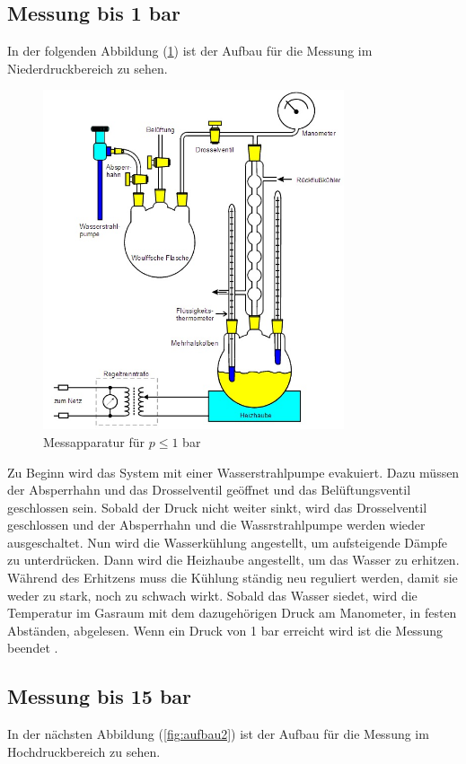 \subsection{Messung bis 1 bar}
In der folgenden Abbildung (\ref{fig:aufbau1}) ist der Aufbau für die Messung im Niederdruckbereich
zu sehen.

\begin{figure}
  \centering
  \includegraphics[height=10cm]{Aufbau1.jpg}
  \caption{Messapparatur für $p ≤ 1$ bar \cite{TU}}
  \label{fig:aufbau1}
\end{figure}

Zu Beginn wird das System mit einer Wasserstrahlpumpe evakuiert. Dazu müssen der
Absperrhahn und das Drosselventil geöffnet und das Belüftungsventil geschlossen sein.
Sobald der Druck nicht weiter sinkt, wird das Drosselventil geschlossen und der Absperrhahn
und die Wassrstrahlpumpe werden wieder ausgeschaltet. Nun wird die Wasserkühlung
angestellt, um aufsteigende Dämpfe zu unterdrücken. Dann wird die Heizhaube angestellt,
um das Wasser zu erhitzen. Während des Erhitzens muss die Kühlung ständig neu
reguliert werden, damit sie weder zu stark, noch zu schwach wirkt.
Sobald das Wasser siedet, wird die Temperatur im Gasraum
mit dem dazugehörigen Druck am Manometer, in festen Abständen, abgelesen.
Wenn ein Druck von 1 bar erreicht wird ist die Messung beendet \cite{TU}.

\subsection{Messung bis 15 bar}
In der nächsten Abbildung (\ref{fig:aufbau2}) ist der Aufbau für die Messung im Hochdruckbereich
zu sehen.

